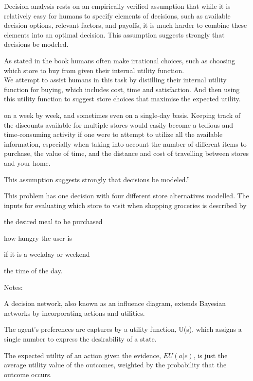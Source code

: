 Decision analysis rests on an empirically verified assumption that while it is relatively easy for humans to specify elements of decisions, such as available decision options, relevant factors, and payoffs, it is much harder to combine these elements into an optimal decision. This assumption suggests strongly that decisions be modeled. 

As stated in the book humans often make irrational choices, such as choosing which store to buy from given their internal utility function. \\
We attempt to assist humans in this task by distilling their internal utility function for buying, which includes cost, time and satisfaction. And then using this utility function to suggest store choices that maximise the expected utility.



on a week by week, and sometimes even on a single-day basis. Keeping track of the discounts available for multiple stores would easily become a tedious and time-consuming activity if one were to attempt to utilize all the available information, especially when taking into account the number of different items to purchase, the value of time, and the distance and cost of travelling between stores and your home.



 This assumption suggests strongly that decisions be modeled.''
 
 This problem has one decision with four different store alternatives modelled. The inputs for evaluating which store to visit when shopping groceries is described by
\begin{enumerate*}[label=\alph*)]
\item the desired meal to be purchased
\item how hungry the user is
\item if it is a weekday or weekend
\item the time of the day.
\end{enumerate*}




Notes:

A decision network, also known as an influence diagram, extends Bayesian networks by incorporating actions and utilities.

The agent's preferences are captures by a utility function, U(s), which assigns a single number to express the desirability of a state.

The expected utility of an action given the evidence, $EU(a\vert{}e)$, is just the average utility value of the outcomes, weighted by the probability that the outcome occurs.

